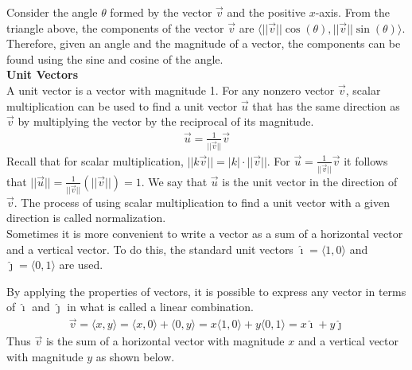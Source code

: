 \documentclass[a4paper]{article}
\let\bf\textbf
\let\la\langle
\let\ra\rangle
\newcommand{\ih}{\hat{\imath}}
\newcommand{\jh}{\hat{\jmath}}
\begin{document}
Consider the angle $\theta$ formed by the vector $\vec{v}$ and the positive $x$-axis. From the triangle above, the components of the vector $\vec{v}$ are $\la ||\vec{v}||\cos(\theta),||\vec{v}||\sin(\theta) \ra$. Therefore, given an angle and the magnitude of a vector, the components can be found using the sine and cosine of the angle.
\vspace{2mm}\\
\bf{Unit Vectors}
\vspace{2mm}\\
A unit vector is a vector with magnitude 1. For any nonzero vector $\vec{v}$, scalar multiplication can be used to find a unit vector $\vec{u}$ that has the same direction as $\vec{v}$ by multiplying the vector by the reciprocal of its magnitude.
\begin{align*}
    \vec{u} = \frac{1}{||\vec{v}||}\vec{v}
\end{align*} 
Recall that for scalar multiplication, $||k\vec{v}|| = |k| \cdot ||\vec{v}||$. For $\vec{u} = \frac{1}{||\vec{v}||}\vec{v}$ it follows that $||\vec{u}|| = \frac{1}{||\vec{v}||}(||\vec{v}||) = 1$. We say that $\vec{u}$ is the unit vector in the direction of $\vec{v}$. The process of using scalar multiplication to find a unit vector with a given direction is called normalization.
\vspace{1mm}\\
Sometimes it is more convenient to write a vector as a sum of a horizontal vector and a vertical vector. To do this, the standard unit vectors $\ih = \la 1, 0 \ra$ and $\jh = \la 0, 1 \ra$ are used.
\begin{center}
\end{center}
By applying the properties of vectors, it is possible to express any vector in terms of $\ih$ and $\jh$ in what is called a linear combination.
\begin{align*}
    \vec{v} = \la x, y \ra = \la x, 0 \ra + \la 0, y \ra = x\la 1, 0 \ra + y\la 0, 1 \ra = x\ih + y\jh
\end{align*}
Thus $\vec{v}$ is the sum of a horizontal vector with magnitude $x$ and a vertical vector with magnitude $y$ as shown below.
\begin{center}
\end{center}
\end{document}
